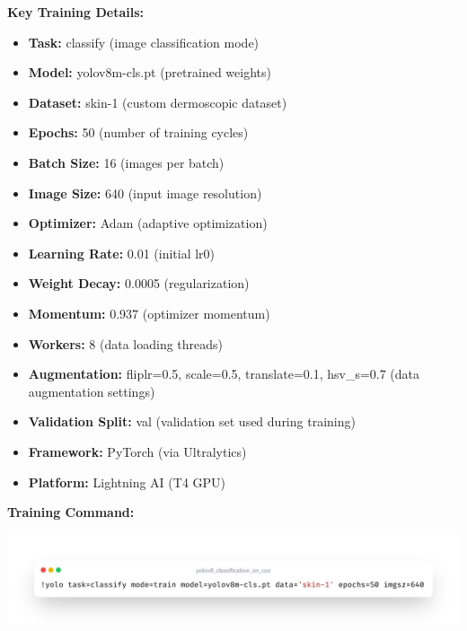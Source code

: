 \documentclass[a4paper,12pt]{report}
\begin{document}
\begin{spacing}{1.5}
    \textbf{Key Training Details:}
    \begin{itemize}
        \item \textbf{Task:} classify (image classification mode)
        \item \textbf{Model:} yolov8m-cls.pt (pretrained weights)
        \item \textbf{Dataset:} skin-1 (custom dermoscopic dataset)
        \item \textbf{Epochs:} 50 (number of training cycles)
        \item \textbf{Batch Size:} 16 (images per batch)
        \item \textbf{Image Size:} 640 (input image resolution)
        \item \textbf{Optimizer:} Adam (adaptive optimization)
        \item \textbf{Learning Rate:} 0.01 (initial lr0)
        \item \textbf{Weight Decay:} 0.0005 (regularization)
        \item \textbf{Momentum:} 0.937 (optimizer momentum)
        \item \textbf{Workers:} 8 (data loading threads)
        \item \textbf{Augmentation:} fliplr=0.5, scale=0.5, translate=0.1, hsv\_s=0.7 (data augmentation settings)
        \item \textbf{Validation Split:} val (validation set used during training)
        \item \textbf{Framework:} PyTorch (via Ultralytics)
        \item \textbf{Platform:} Lightning AI (T4 GPU)
    \end{itemize}
    
    \textbf{Training Command:}

    \begin{center}
        \includegraphics[width=\textwidth,keepaspectratio]{code/train.png}
    \end{center}



\end{spacing}
\end{document}
